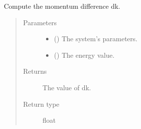 \documentclass[letterpaper,10pt,english]{sphinxmanual}
\begin{document}
\begin{fulllineitems}
\label{\detokenize{modules:modules.utils.compute_momentum_difference}}
\pysigstartsignatures
{}
\pysigstopsignatures
\sphinxAtStartPar
Compute the momentum difference dk.
\begin{quote}\begin{description}
\item[{Parameters}] \leavevmode\begin{itemize}
\item {} 
\sphinxAtStartPar
{} () \textendash{} The system’s parameters.

\item {} 
\sphinxAtStartPar
{} () \textendash{} The energy value.

\end{itemize}

\item[{Returns}] \leavevmode
\sphinxAtStartPar
The value of dk.

\item[{Return type}] \leavevmode
\sphinxAtStartPar
float

\end{description}\end{quote}

\end{fulllineitems}

\end{document}

